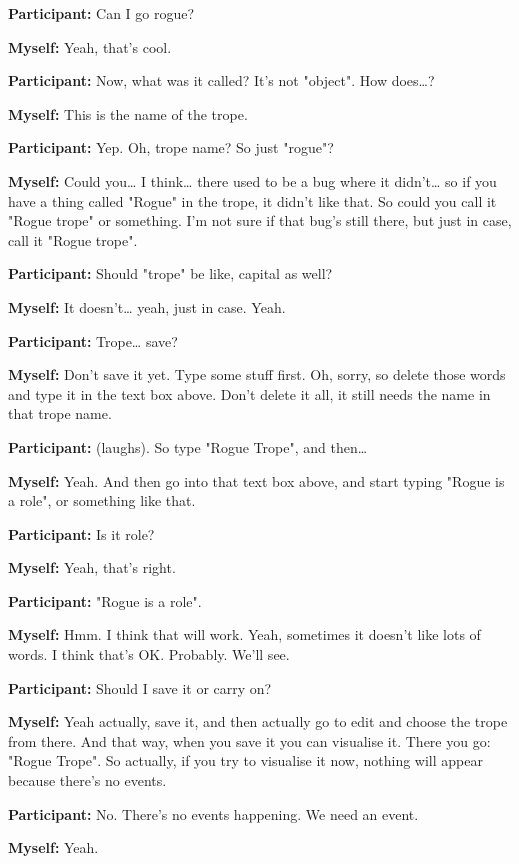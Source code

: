 \documentclass[11pt]{report}
\begin{document}
\begin{linenumbers}
\textbf{Participant:} Can I go rogue?

\textbf{Myself:} Yeah, that's cool.

\textbf{Participant:} Now, what was it called? It's not "object". How does\ldots{}?

\textbf{Myself:} This is the name of the trope.

\textbf{Participant:} Yep. Oh, trope name? So just "rogue"?

\textbf{Myself:} Could you\ldots{} I think\ldots{} there used to be a bug where it didn't\ldots{} so if you have a thing called "Rogue" in the trope, it didn't like that. So could you call it "Rogue trope" or something. I'm not sure if that bug's still there, but just in case, call it "Rogue trope".

\textbf{Participant:} Should "trope" be like, capital as well?

\textbf{Myself:} It doesn't\ldots{} yeah, just in case. Yeah.

\textbf{Participant:} Trope\ldots{} save?

\textbf{Myself:} Don't save it yet. Type some stuff first. Oh, sorry, so delete those words and type it in the text box above. Don't delete it all, it still needs the name in that trope name.

\textbf{Participant:} (laughs). So type "Rogue Trope", and then\ldots{}

\textbf{Myself:} Yeah. And then go into that text box above, and start typing "Rogue is a role", or something like that.

\textbf{Participant:} Is it role?

\textbf{Myself:} Yeah, that's right.

\textbf{Participant:} "Rogue is a role".

\textbf{Myself:} Hmm. I think that will work. Yeah, sometimes it doesn't like lots of words. I think that's OK. Probably. We'll see.

\textbf{Participant:} Should I save it or carry on?

\textbf{Myself:} Yeah actually, save it, and then actually go to edit and choose the trope from there. And that way, when you save it you can visualise it. There you go: "Rogue Trope". So actually, if you try to visualise it now, nothing will appear because there's no events.

\textbf{Participant:} No. There's no events happening. We need an event.

\textbf{Myself:} Yeah.


\end{linenumbers}
\end{document}
